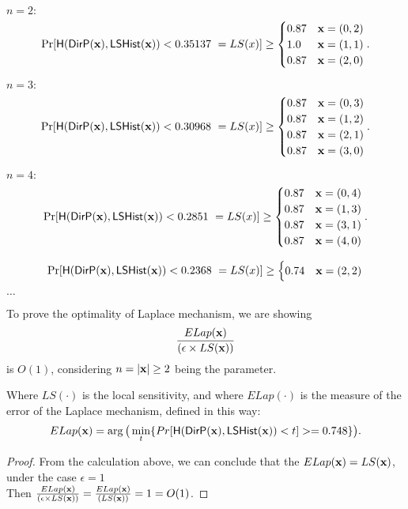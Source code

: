 \documentclass{article}
\begin{document}
{\small

\noindent $n = 2:$
\[
\Pr[\hlg(\bysinfer{\dataobs}, \ilapmech(\dataobs)) < 0.35137 ~ = LS(x)]
\geq \begin{cases}
	0.87	& \dataobs = (0, 2)\\
%
	1.0		& \dataobs = (1, 1)\\
%
	0.87	& \dataobs = (2, 0)\\
\end{cases}.
\]


\noindent $n = 3:$
\[
\Pr[\hlg(\bysinfer{\dataobs}, \ilapmech(\dataobs)) < 0.30968 ~ = LS(x)]
\geq \begin{cases}
 	0.87
	& \dataobs = (0, 3)\\
%
 	0.87
	& \dataobs = (1, 2)\\
%
 	0.87
	& \dataobs = (2, 1)\\
%
	0.87
	& \dataobs = (3, 0)
\end{cases}.
\]

\noindent $n = 4:$
\[
\Pr[\hlg(\bysinfer{\dataobs}, \ilapmech(\dataobs)) < 0.2851 ~ = LS(x)]
\geq 
\begin{cases}
 	0.87
	& \dataobs = (0, 4)\\
%
 	0.87
	& \dataobs = (1, 3)\\
%
	0.87
	& \dataobs = (3, 1)\\
%
	0.87
	& \dataobs = (4, 0)
\end{cases}.
\]

\[
\Pr[\mathsf{H}(\mathsf{DirP}(\textbf{x}), \mathsf{LSHist}(\textbf{x})) < 0.2368 ~ = LS(x)]
\geq
\begin{cases}
0.74 & \textbf{x} = (2, 2)
\end{cases}
\]




$\dots$

\begin{thm}
To prove the optimality of Laplace mechanism, we are showing 
\[
\frac{ELap(\textbf{x})}{(\epsilon \times LS(\textbf{x}))}
\]
is $O(1)$, considering $n=|\textbf{x}| \geq 2$ being the parameter.

Where $LS(\cdot)$ is the local sensitivity, and where $ELap(\cdot)$ is the measure of the error of the Laplace mechanism, defined in this way:
\[
ELap(\textbf{x}) = \arg\big( \min\limits_{t}\{Pr[\mathsf{H}(\mathsf{DirP}(\textbf{x}), \mathsf{LSHist}(\textbf{x}))< t] >= 0.748\} \big).
\]
\end{thm}

\begin{proof}
From the calculation above, we can conclude that the $ELap(\textbf{x}) = LS(\textbf{x})$, under the case $\epsilon = 1$\\
Then $\frac{ELap(\textbf{x})}{(\epsilon \times LS(\textbf{x}))} = \frac{ELap(\textbf{x})}{(LS(\textbf{x}))} = 1 = O(1)$.


\end{proof}}
\end{document}
